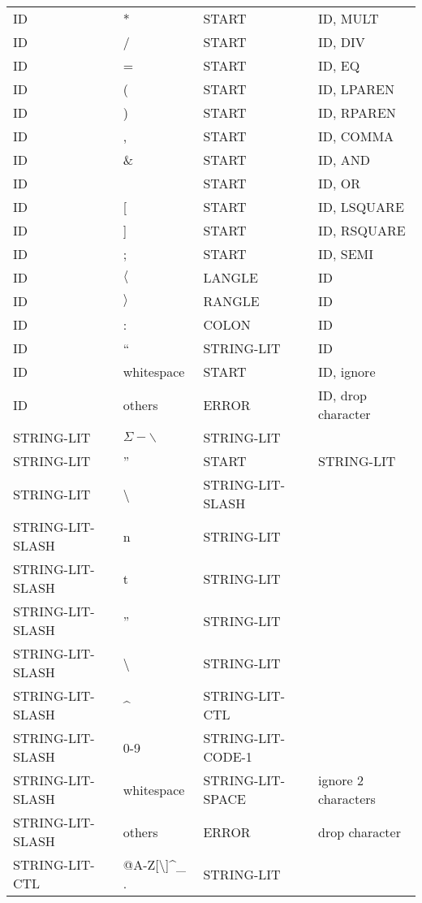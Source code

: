 \documentclass[11pt, fleqn]{article}
\begin{document}
\begin{longtable}{l|l|l|l}
ID			&	*								&	START			&	ID, MULT					\\
ID			&	/								&	START			&	ID, DIV					\\
ID			&	=								&	START			&	ID, EQ					\\
ID			&	(								&	START			&	ID, LPAREN				\\
ID			&	)								&	START			&	ID, RPAREN				\\
ID			&	,								&	START			&	ID, COMMA				\\
ID			&	\&								&	START			&	ID, AND					\\
ID			&	\textbar							&	START			&	ID, OR					\\
ID			&	[								&	START			&	ID, LSQUARE				\\
ID			&	]								&	START			&	ID, RSQUARE				\\
ID			&	;								&	START			&	ID, SEMI					\\
ID			&	$\langle$						&	LANGLE			&	ID					\\
ID			&	$\rangle$						&	RANGLE			&	ID					\\
ID			&	:								&	COLON			&	ID					\\
ID			&	``								&	STRING-LIT		&	ID					\\
ID			&	whitespace						&	START			&	ID, ignore			\\
ID			&	others							&	ERROR			&	ID, drop character	\\
STRING-LIT			&	$\Sigma - {\backslash}$	&	STRING-LIT			&						\\
STRING-LIT			&	''						&	START				&	STRING-LIT			\\
STRING-LIT			&	\textbackslash			&	STRING-LIT-SLASH		&						\\
STRING-LIT-SLASH		&	n						&	STRING-LIT			&						\\
STRING-LIT-SLASH		&	t						&	STRING-LIT			&								\\
STRING-LIT-SLASH		&	''						&	STRING-LIT			&								\\
STRING-LIT-SLASH		&	\textbackslash			&	STRING-LIT			&								\\
STRING-LIT-SLASH		&	\textasciicircum			&	STRING-LIT-CTL		&								\\
STRING-LIT-SLASH		&	0-9						&	STRING-LIT-CODE-1	&					\\
STRING-LIT-SLASH		&	whitespace				&	STRING-LIT-SPACE		& ignore 2 characters			\\
STRING-LIT-SLASH		&	others					&	ERROR				& drop character				\\
STRING-LIT-CTL		&	@A-Z[\textbackslash]\textasciicircum\_ .		&	STRING-LIT			&			\\

\end{longtable}
\end{document}
